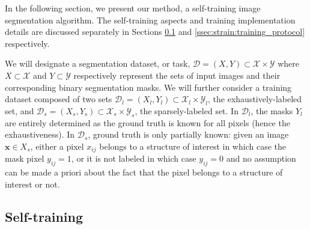 In the following section, we present our method, a self-training image segmentation algorithm. The self-training aspects and training implementation details are discussed separately in Sections \ref{ssec:strain:self_training} and \ref{ssec:strain:training_protocol} respectively.

We will designate a segmentation dataset, or task, $\mathcal{D} = \left(X, Y\right) \subset \mathcal{X} \times \mathcal{Y}$ where $X \subset \mathcal{X}$ and $Y \subset \mathcal{Y}$ respectively represent the sets of input images and their corresponding binary segmentation masks. We will further consider a training dataset composed of two sets $\mathcal{D}_l = \left(X_l, Y_l\right) \subset \mathcal{X}_l \times \mathcal{Y}_l$, the exhaustively-labeled set, and $\mathcal{D}_s = \left(X_s, Y_s\right) \subset \mathcal{X}_s \times \mathcal{Y}_s$, the sparsely-labeled set. In $\mathcal{D}_l$, the masks $Y_l$ are entirely determined as the ground truth is known for all pixels (hence the exhaustiveness). In $\mathcal{D}_s$, ground truth is only partially known: given an image $\mathbf{x} \in X_s$, either a pixel $x_{ij}$ belongs to a structure of interest in which case the mask pixel $y_{ij} = 1$, or it is not labeled in which case $y_{ij} = 0$ and no assumption can be made a priori about the fact that the pixel belongs to a structure of interest or not. 

\subsection{Self-training}
\label{ssec:strain:self_training}
 
